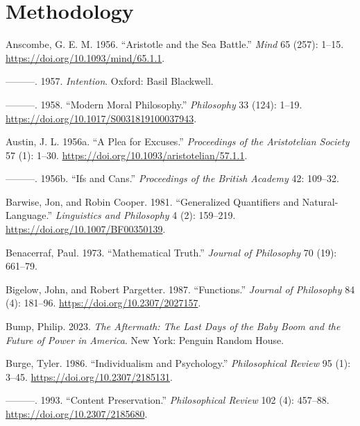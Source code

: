 \documentclass[
  12pt,
  letterpaper,
  DIV=11,
  numbers=noendperiod]{scrartcl}
\newlength{\cslhangindent}
\newenvironment{CSLReferences}[2] %
 {\begin{list}{}{%
  \setlength{\itemindent}{0pt}
  \setlength{\leftmargin}{0pt}
  \setlength{\parsep}{0pt}
  \ifodd #1
   \setlength{\leftmargin}{\cslhangindent}
   \setlength{\itemindent}{-1\cslhangindent}
  \fi
  \setlength{\itemsep}{#2\baselineskip}}}
 {\end{list}}
\begin{document}
\section{Methodology}\label{sec-methodology}

\label{refs}
\begin{CSLReferences}{1}{0}
Anscombe, G. E. M. 1956. {``Aristotle and the Sea Battle.''} \emph{Mind}
65 (257): 1--15. \url{https://doi.org/10.1093/mind/65.1.1}.

---------. 1957. \emph{Intention}. Oxford: Basil Blackwell.

---------. 1958. {``Modern Moral Philosophy.''} \emph{Philosophy} 33
(124): 1--19. \url{https://doi.org/10.1017/S0031819100037943}.

Austin, J. L. 1956a. {``A Plea for Excuses.''} \emph{Proceedings of the
Aristotelian Society} 57 (1): 1--30.
\url{https://doi.org/10.1093/aristotelian/57.1.1}.

---------. 1956b. {``Ifs and Cans.''} \emph{Proceedings of the British
Academy} 42: 109--32.

Barwise, Jon, and Robin Cooper. 1981. {``Generalized Quantifiers and
Natural-Language.''} \emph{Linguistics and Philosophy} 4 (2): 159--219.
\url{https://doi.org/10.1007/BF00350139}.

Benacerraf, Paul. 1973. {``Mathematical Truth.''} \emph{Journal of
Philosophy} 70 (19): 661--79.

Bigelow, John, and Robert Pargetter. 1987. {``Functions.''}
\emph{Journal of Philosophy} 84 (4): 181--96.
\url{https://doi.org/10.2307/2027157}.

Bump, Philip. 2023. \emph{The Aftermath: The Last Days of the Baby Boom
and the Future of Power in America}. New York: Penguin Random House.

Burge, Tyler. 1986. {``Individualism and Psychology.''}
\emph{Philosophical Review} 95 (1): 3--45.
\url{https://doi.org/10.2307/2185131}.

---------. 1993. {``Content Preservation.''} \emph{Philosophical Review}
102 (4): 457--88. \url{https://doi.org/10.2307/2185680}.


\end{CSLReferences}
\end{document}
